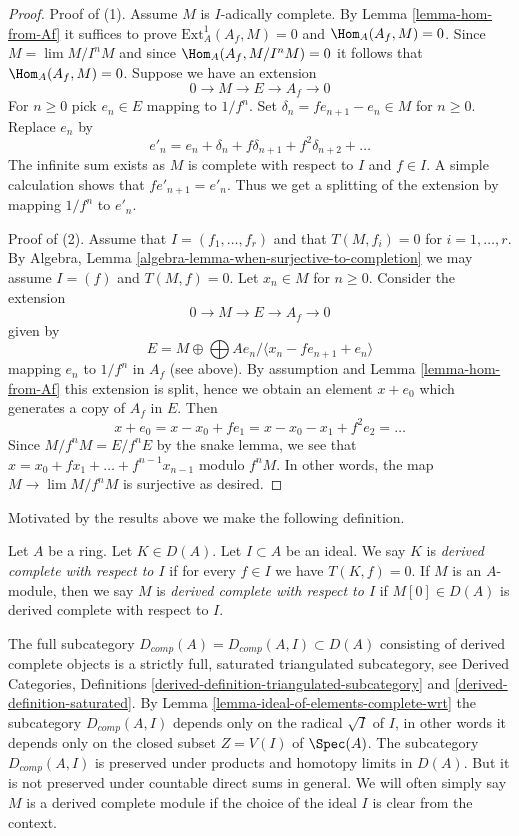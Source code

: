 \begin{proof}
Proof of (1). Assume $M$ is $I$-adically complete.
By Lemma \ref{lemma-hom-from-Af} it suffices to prove
$\text{Ext}^1_A(A_f, M) = 0$ and $\Hom_A(A_f, M) = 0$.
Since $M = \lim M/I^nM$ and since $\Hom_A(A_f, M/I^nM) = 0$
it follows that $\Hom_A(A_f, M) = 0$. Suppose we have an extension
$$
0 \to M \to E \to A_f \to 0
$$
For $n \geq 0$ pick $e_n \in E$ mapping to $1/f^n$.
Set $\delta_n = fe_{n + 1} - e_n \in M$ for $n \geq 0$.
Replace $e_n$ by
$$
e'_n = e_n + \delta_n + f\delta_{n + 1} + f^2 \delta_{n + 2} + \ldots
$$
The infinite sum exists as $M$ is complete with respect to $I$ and $f \in I$.
A simple calculation shows that $fe'_{n + 1} = e'_n$. Thus we get a splitting
of the extension by mapping $1/f^n$ to $e'_n$.

\medskip\noindent
Proof of (2). Assume that $I = (f_1, \ldots, f_r)$ and that $T(M, f_i) = 0$
for $i = 1, \ldots, r$. By
Algebra, Lemma \ref{algebra-lemma-when-surjective-to-completion}
we may assume $I = (f)$ and $T(M, f) = 0$. Let $x_n \in M$ for $n \geq 0$.
Consider the extension
$$
0 \to M \to E \to A_f \to 0
$$
given by
$$
E = M \oplus \bigoplus Ae_n\Big/\langle x_n - fe_{n + 1} + e_n\rangle
$$
mapping $e_n$ to $1/f^n$ in $A_f$ (see above).
By assumption and Lemma \ref{lemma-hom-from-Af}
this extension is split, hence we obtain an element
$x + e_0$ which generates a copy of $A_f$ in $E$.
Then
$$
x + e_0 = x - x_0 + fe_1 = x - x_0 - x_1 + f^2 e_2 = \ldots
$$
Since $M/f^nM = E/f^nE$ by the snake lemma, we see that
$x = x_0 + fx_1 + \ldots + f^{n - 1}x_{n - 1}$ modulo $f^nM$.
In other words, the map $M \to \lim M/f^nM$ is surjective as desired.
\end{proof}

\noindent
Motivated by the results above we make the following definition.

\begin{definition}
\label{definition-derived-complete}
Let $A$ be a ring. Let $K \in D(A)$. Let $I \subset A$ be an ideal.
We say $K$ is {\it derived complete with respect to $I$}
if for every $f \in I$ we have $T(K, f) = 0$.
If $M$ is an $A$-module, then we say $M$ is
{\it derived complete with respect to $I$}
if $M[0] \in D(A)$ is derived complete with respect to $I$.
\end{definition}

\noindent
The full subcategory $D_{comp}(A) = D_{comp}(A, I) \subset D(A)$
consisting of derived complete objects is a strictly full, saturated
triangulated subcategory, see
Derived Categories, Definitions
\ref{derived-definition-triangulated-subcategory} and
\ref{derived-definition-saturated}.
By Lemma \ref{lemma-ideal-of-elements-complete-wrt}
the subcategory $D_{comp}(A, I)$ depends only on the radical
$\sqrt{I}$ of $I$, in other words it depends only on the closed
subset $Z = V(I)$ of $\Spec(A)$. The subcategory $D_{comp}(A, I)$ is preserved
under products and homotopy limits in $D(A)$.
But it is not preserved under countable direct sums in general.
We will often simply say $M$ is a derived complete module if
the choice of the ideal $I$ is clear from the context.

